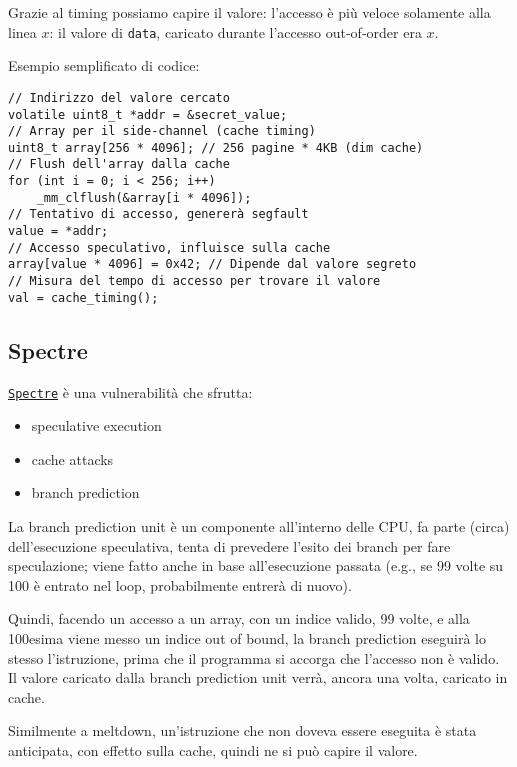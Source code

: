 Grazie al timing possiamo capire il valore: l'accesso è più veloce solamente alla linea $x$: il valore di \texttt{data}, caricato durante l'accesso out-of-order era $x$.

Esempio semplificato di codice: 
\begin{verbatim}
// Indirizzo del valore cercato
volatile uint8_t *addr = &secret_value;
// Array per il side-channel (cache timing)
uint8_t array[256 * 4096]; // 256 pagine * 4KB (dim cache)
// Flush dell'array dalla cache
for (int i = 0; i < 256; i++)
    _mm_clflush(&array[i * 4096]);
// Tentativo di accesso, genererà segfault
value = *addr;
// Accesso speculativo, influisce sulla cache
array[value * 4096] = 0x42; // Dipende dal valore segreto
// Misura del tempo di accesso per trovare il valore
val = cache_timing();
\end{verbatim}

\subsection{Spectre}

\href{https://spectreattack.com/spectre.pdf}{\texttt{Spectre}} è una vulnerabilità che sfrutta:
\begin{itemize}
	\item speculative execution
	
    \item cache attacks
	
    \item branch prediction
\end{itemize}

La branch prediction unit è un componente all'interno delle CPU, fa parte (circa) dell'esecuzione speculativa, tenta di prevedere l'esito dei branch per fare speculazione; viene fatto anche in base all'esecuzione passata (e.g., se 99 volte su 100 è entrato nel loop, probabilmente entrerà di nuovo).

Quindi, facendo un accesso a un array, con un indice valido, 99 volte, e alla 100esima viene messo un indice out of bound, la branch prediction eseguirà lo stesso l'istruzione, prima che il programma si accorga che l'accesso non è valido. Il valore caricato dalla branch prediction unit verrà, ancora una volta, caricato in cache.

Similmente a meltdown, un'istruzione che non doveva essere eseguita è stata anticipata, con effetto sulla cache, quindi ne si può capire il valore. 

